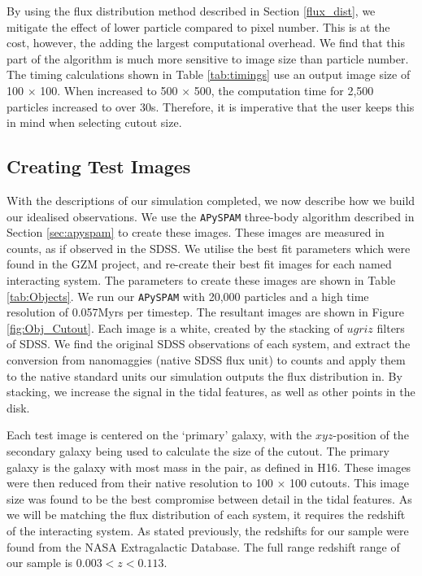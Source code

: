 By using the flux distribution method described in Section \ref{flux_dist}, we mitigate the effect of lower particle compared to pixel number. This is at the cost, however, the adding the largest computational overhead. We find that this part of the algorithm is much more sensitive to image size than particle number. The timing calculations shown in Table \ref{tab:timings} use an output image size of 100 $\times$ 100. When increased to 500 $\times$ 500, the computation time for 2,500 particles increased to over 30s. Therefore, it is imperative that the user keeps this in mind when selecting cutout size.

\subsection{Creating Test Images}\label{sec:syn_sample}
With the descriptions of our simulation completed, we now describe how we build our idealised observations. We use the \texttt{APySPAM} three-body algorithm described in Section \ref{sec:apyspam} to create these images. These images are measured in counts, as if observed in the SDSS. We utilise the best fit parameters which were found in the GZM project, and re-create their best fit images for each named interacting system. The parameters to create these images are shown in Table \ref{tab:Objects}. We run our \texttt{APySPAM} with 20,000 particles and a high time resolution of 0.057Myrs per timestep. The resultant images are shown in Figure \ref{fig:Obj_Cutout}. Each image is a white, created by the stacking of $ugriz$ filters of SDSS. We find the original SDSS observations of each system, and extract the conversion from nanomaggies (native SDSS flux unit) to counts and apply them to the native standard units our simulation outputs the flux distribution in. By stacking, we increase the signal in the tidal features, as well as other points in the disk. 

Each test image is centered on the `primary' galaxy, with the $xyz$-position of the secondary galaxy being used to calculate the size of the cutout. The primary galaxy is the galaxy with most mass in the pair, as defined in H16. These images were then reduced from their native resolution to 100 $\times$ 100 cutouts. This image size was found to be the best compromise between detail in the tidal features. As we will be matching the flux distribution of each system, it requires the redshift of the interacting system. As stated previously, the redshifts for our sample were found from the NASA Extragalactic Database. The full range redshift range of our sample is $0.003 < z < 0.113$.

